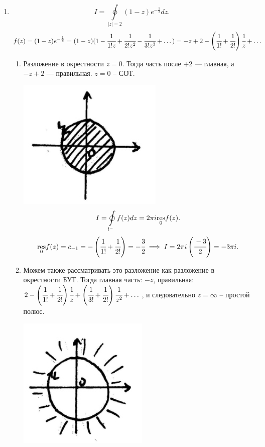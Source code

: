 \documentclass[../../main.tex]{subfiles}
\begin{document}
	 \begin{examples}
	 	\begin{enumerate}
	 		\item 
	 		\[
	 		I=\oint\limits_{|z|=2}(1-z)e^{-\frac1z}dz.
	 		\]
	 		\[
	 		f(z)=(1-z)e^{-\frac1z}=(1-z)(1- \cfrac{1}{1!z} + \cfrac{1}{2!z^2}- \cfrac{1}{3!z^3}+\dots)=-z+2-\left( \cfrac{1}{1!} + \cfrac{1}{2!}
	 		\right)\cfrac{1}{z}+\dots
	 		\]
	 		
	 		\begin{enumerate}
	 			\item Разложение в окрестности $z=0$. Тогда часть после $+2$ --- главная, а $-z+2$ --- правильная. $z=0$ -- СОТ.
	 			
	 			\includegraphics{lec35_3}
	 			\[
	 			I=\oint\limits_{l^-}f(z)dz = 2\pi i \underset{0}{\operatorname{res}}f(z).
	 			\]
	 			\[
	 			\underset{0}{\operatorname{res}}f(z)=c_{-1}=-\left( \cfrac{1}{1!} + \cfrac{1}{2!}\right)=
	 			-\cfrac{3}{2} \implies I=2\pi i \left( \cfrac{-3}{2}\right)=
	 			-3\pi i.
	 			\]
	 			\item Можем также рассматривать это разложение как разложение в окрестности БУТ. Тогда главная часть: $-z$, правильная: 
	 			$2-\left( \cfrac{1}{1!} + \cfrac{1}{2!} \right)\cfrac{1}{z}+
	 			\left( \cfrac{1}{3!} + \cfrac{1}{2!} \right)\cfrac{1}{z^2}+\dots$, и следовательно $z=\infty$ -- простой полюс.
	 			
	 			\includegraphics{lec35_4}
	 			

\end{enumerate}
\end{enumerate}
\end{examples}
\end{document}
